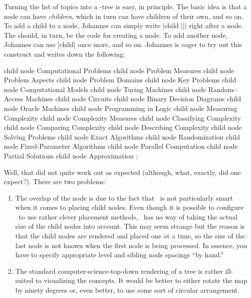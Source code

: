 Turning the list of topics into a \tikzname-tree is easy, in
principle. The basic idea is that a node can have \emph{children},
which in turn can have children of their own, and so on. To add a
child to a node, Johannes can simply write |child {||}|
right after a node. The  should, in turn, be the code for
creating a node. To add another node, Johannes can use |child| once
more, and so on. Johannes is eager to try out this construct and
writes down the following:

\begin{codeexample}[]
\tikz
    child { node {Computational Problems}
      child { node {Problem Measures} }
      child { node {Problem Aspects} }
      child { node {Problem Domains} }
      child { node {Key Problems} }
    }
    child { node {Computational Models}
      child { node {Turing Machines} }
      child { node {Random-Access Machines} }
      child { node {Circuits} }
      child { node {Binary Decision Diagrams} }
      child { node {Oracle Machines} }
      child { node {Programming in Logic} }
    }
    child { node {Measuring Complexity} 
      child { node {Complexity Measures} }
      child { node {Classifying Complexity} }
      child { node {Comparing Complexity} }
      child { node {Describing Complexity} }
    }
    child { node {Solving Problems}
      child { node {Exact Algorithms} }
      child { node {Randomization} }
      child { node {Fixed-Parameter Algorithms} }
      child { node {Parallel Computation} }
      child { node {Partial Solutions} }
      child { node {Approximation} }
    };    
\end{codeexample}

Well, that did not quite work out as expected (although, what,
exactly, did one expect?). There are two problems:
\begin{enumerate}
\item The overlap of the node is due to the fact that \tikzname\ is
  not particularly smart when it comes to placing child nodes. Even
  though it is possible to configure \tikzname\ to use rather clever
  placement methods, \tikzname\ has no way of taking the actual size
  of the child nodes into account. This may seem strange but the
  reason is that the child nodes are rendered and placed one at a
  time, so the size of the last node is not known when the first node
  is being processed. In essence, you have to specify appropriate
  level and sibling node spacings ``by hand.''
\item The standard computer-science-top-down rendering of a tree is
  rather ill-suited to visualizing the concepts. It would be better to
  either rotate the map by ninety degrees or, even better, to use some
  sort of circular arrangement.
\end{enumerate}

